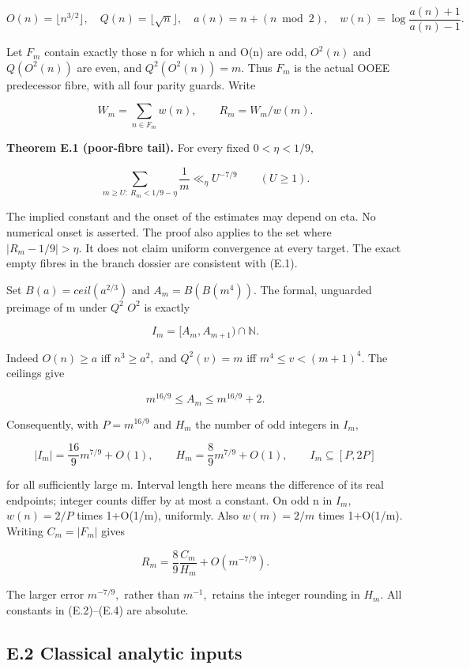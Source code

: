 \documentclass[11pt,a4paper]{article}
\begin{document}
\[
 O(n)=\lfloor n^{3/2}\rfloor,\quad Q(n)=\lfloor\sqrt n\rfloor,
 \quad a(n)=n+(n\bmod2),\quad
 w(n)=\log\frac{a(n)+1}{a(n)-1}.
\]

Let \(F_m\) contain exactly those n for which n and O(n) are odd,
\(O^2(n)\) and \(Q(O^2(n))\) are even, and \(Q^2(O^2(n))=m.\) Thus
\(F_m\) is the actual OOEE predecessor fibre, with all four parity
guards. Write

\[
 W_m=\sum_{n\in F_m}w(n),\qquad R_m=W_m/w(m).
\]

\textbf{Theorem E.1 (poor-fibre tail).} For every fixed \(0<\eta<1/9,\)

\[
 \sum_{m\ge U:\ R_m<1/9-\eta}\frac1m
       \ll_\eta U^{-7/9}\qquad(U\ge1).
 \tag{E.1}
\]

The implied constant and the onset of the estimates may depend on eta.
No numerical onset is asserted. The proof also applies to the set where
\(|R_m-1/9|>\eta.\) It does not claim uniform convergence at every
target. The exact empty fibres in the branch dossier are consistent with
(E.1).

Set \(B(a)=ceil(a^{2/3})\) and \(A_m=B(B(m^4)).\) The formal, unguarded
preimage of m under \(Q^2\) \(O^2\) is exactly

\[
 I_m=[A_m,A_{m+1})\cap\mathbb N.
 \tag{E.2}
\]

Indeed \(O(n)\ge a\) iff \(n^3\ge a^2,\) and \(Q^2(v)=m\) iff
\(m^4\le v<(m+1)^4.\) The ceilings give

\[
 m^{16/9}\le A_m\le m^{16/9}+2.
\]

Consequently, with \(P=m^{16/9}\) and \(H_m\) the number of odd integers
in \(I_m,\)

\[
 |I_m|=\frac{16}{9}m^{7/9}+O(1),\qquad
 H_m=\frac89m^{7/9}+O(1),\qquad I_m\subseteq[P,2P]
 \tag{E.3}
\]

for all sufficiently large m. Interval length here means the difference
of its real endpoints; integer counts differ by at most a constant. On
odd n in \(I_m,\) \(w(n)=2/P\) times 1+O(1/m), uniformly. Also
\(w(m)=2/m\) times 1+O(1/m). Writing \(C_m=|F_m|\) gives

\[
 R_m=\frac89\frac{C_m}{H_m}+O(m^{-7/9}).
 \tag{E.4}
\]

The larger error \(m^{-7/9},\) rather than \(m^{-1},\) retains the
integer rounding in \(H_m.\) All constants in (E.2)--(E.4) are absolute.

\subsection{E.2 Classical analytic
inputs}\label{e.2-classical-analytic-inputs}
\end{document}
